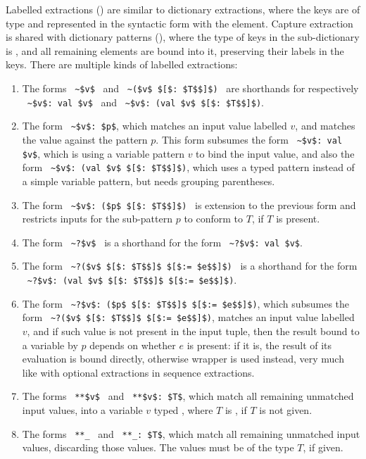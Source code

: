 Labelled extractions () are similar to dictionary extractions, where the keys are of type  and represented in the syntactic form with the  element. Capture extraction is shared with dictionary patterns (), where the type of keys in the sub-dictionary is , and all remaining elements are bound into it, preserving their labels in the keys. There are multiple kinds of labelled extractions: 
\begin{enumerate}
  \item The forms ~\lstinline!~$v$!~ and ~\lstinline!~($v$ $[$: $T$$]$)!~ are shorthands for respectively ~\lstinline!~$v$: val $v$!~ and ~\lstinline!~$v$: (val $v$ $[$: $T$$]$)!. 
  \item The form ~\lstinline!~$v$: $p$!, which matches an input value labelled $v$, and matches the value against the pattern $p$. This form subsumes the form ~\lstinline!~$v$: val $v$!, which is using a variable pattern $v$ to bind the input value, and also the form ~\lstinline!~$v$: (val $v$ $[$: $T$$]$)!, which uses a typed pattern instead of a simple variable pattern, but needs grouping parentheses. 
  \item The form ~\lstinline!~$v$: ($p$ $[$: $T$$]$)!~ is extension to the previous form and restricts inputs for the sub-pattern $p$ to conform to $T$, if $T$ is present. 
  \item The form ~\lstinline!~?$v$!~ is a shorthand for the form ~\lstinline!~?$v$: val $v$!. 
  \item The form ~\lstinline!~?($v$ $[$: $T$$]$ $[$:= $e$$]$)!~ is a shorthand for the form ~\lstinline!~?$v$: (val $v$ $[$: $T$$]$ $[$:= $e$$]$)!. 
  \item The form ~\lstinline!~?$v$: ($p$ $[$: $T$$]$ $[$:= $e$$]$)!, which subsumes the form ~\lstinline!~?($v$ $[$: $T$$]$ $[$:= $e$$]$)!, matches an input value labelled $v$, and if such value is not present in the input tuple, then the result bound to a variable by $p$ depends on whether $e$ is present: if it is, the result of its evaluation is bound directly, otherwise  wrapper is used instead, very much like with optional extractions in sequence extractions. 
  \item The forms ~\lstinline!**$v$!~ and ~\lstinline!**$v$: $T$!, which match all remaining unmatched input values, into a variable $v$ typed , where $T$ is , if $T$ is not given.
  \item The forms ~\lstinline!**_!~ and ~\lstinline!**_: $T$!, which match all remaining unmatched input values, discarding those values. The values must be of the type $T$, if given. 
\end{enumerate}

